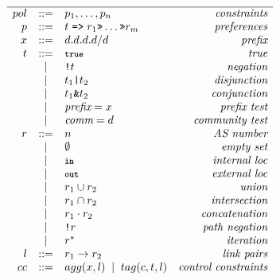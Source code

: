 \documentclass{sig-alternate-10pt}
\newcommand{\CD}[1]{\texttt{\small #1}}  %
\newcommand{\KW}[1]{\texttt{\small\bfseries{#1}}}
\newcommand{\True}{\CD{true}}
\newcommand{\Prefer}{\texttt{>>}}
\newcommand{\Path}{\texttt{=>}}
\newcommand{\In}{\KW{in}}
\newcommand{\Out}{\KW{out}}
\newcommand{\AND}{\texttt{\&}}
\newcommand{\OR}{\texttt{|}}
\newcommand{\NOT}{\texttt{!}}
\providecommand{\DIFaddbegin}{} %
\providecommand{\DIFdelend}{} %
\begin{document}


\DIFdelend \DIFaddbegin \begin{figure}\small
  \begin{minipage}[t]{.45\linewidth}
  \vspace*{-1\baselineskip}
  \[ \begin{array}{rclr}
    \hline

     pol     &::=& p_1, \dots, p_n & \textit{constraints} \\
     p       &::=& t \hspace{.3em} \Path \hspace{.3em} r_1 \Prefer \dots \Prefer r_m & \textit{preferences} \\
     x       &::=& d.d.d.d/d & \textit{prefix} \\
     t       &::=& \True & \textit{true} \\
         &\BNFALT& \NOT t & \textit{negation} \\
         &\BNFALT& t_1 \OR{} t_2 & \textit{disjunction} \\
         &\BNFALT& t_1 \AND{} t_2 & \textit{conjunction} \\
         &\BNFALT& \textit{prefix} = x & \textit{prefix test} \\
         &\BNFALT& \textit{comm} = d & \textit{community test} \\
     r       &::=& n & \textit{AS number} \\
         &\BNFALT& \emptyset & \textit{empty set} \\
         &\BNFALT& \In & \textit{internal loc} \\
         &\BNFALT& \Out & \textit{external loc} \\
         &\BNFALT& r_1 \cup r_2 & \textit{union} \\
         &\BNFALT& r_1 \cap r_2 & \textit{intersection} \\
         &\BNFALT& r_1 \cdot r_2 & \textit{concatenation} \\
         &\BNFALT& \NOT r & \textit{path negation} \\
         &\BNFALT& r^* & \textit{iteration} \\
     l       &::=& r_1 \rightarrow r_2 & \textit{link pairs} \\
     cc     &::=& agg(x, l) \BNFALT tag(c, t, l) & \textit{control constraints} \\
  \end{array} \]


\end{minipage}
\end{figure}
\end{document}
